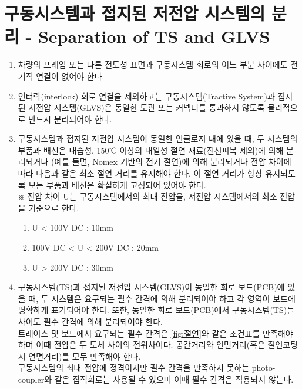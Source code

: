 \documentclass[final,a4paper,10pt]{report}
\begin{document}
\section{구동시스템과 접지된 저전압 시스템의 분리 - Separation of TS and GLVS}
\begin{enumerate}
  \item 차량의 프레임 또는 다른 전도성 표면과 구동시스템 회로의 어느 부분 사이에도 전기적 연결이 없어야 한다.
  \item 인터락(interlock) 회로 연결을 제외하고는 구동시스템(Tractive System)과 접지된 저전압 시스템(GLVS)은 동일한 도관 또는 커넥터를 통과하지 않도록 물리적으로 반드시 분리되어야 한다.
  \item 구동시스템과 접지된 저전압 시스템이 동일한 인클로저 내에 있을 때, 두 시스템의 부품과 배선은 내습성, 150℃ 이상의 내열성 절연 재료(전선피복 제외)에 의해 분리되거나 (예를 들면, Nomex 기반의 전기 절연)에 의해 분리되거나 전압 차이에 따라 다음과 같은 최소 절연 거리를 유지해야 한다. 이 절연 거리가 항상 유지되도록 모든 부품과 배선은 확실하게 고정되어 있어야 한다.\\
  ※ 전압 차이 U는 구동시스템에서의 최대 전압을, 저전압 시스템에서의 최소 전압을 기준으로 한다.
    \begin{enumerate}
      \item U < 100V DC : 10mm
      \item 100V DC < U < 200V DC : 20mm
      \item U > 200V DC : 30mm
    \end{enumerate}
    
  \item 구동시스템(TS)과 접지된 저전압 시스템(GLVS)이 동일한 회로 보드(PCB)에 있을 때, 두 시스템은 요구되는 필수 간격에 의해 분리되어야 하고 각 영역이 보드에 명확하게 표기되어야 한다. 또한, 동일한 회로 보드(PCB)에서 구동시스템(TS)들 사이도 필수 간격에 의해 분리되어야 한다.\\
    트레이스 및 보드에서 요구되는 필수 간격은 \cref{fig:절연}와 같은 조건표를 만족해야 하며 이때 전압은 두 도체 사이의 전위차이다. 공간거리와 연면거리(혹은 절연코팅시 연면거리)를 모두 만족해야 한다.\\
    구동시스템의 최대 전압에 정격이지만 필수 간격을 만족하지 못하는 photo-coupler와 같은 집적회로는 사용될 수 있으며 이때 필수 간격은 적용되지 않는다.
    

\end{enumerate}
\end{document}
